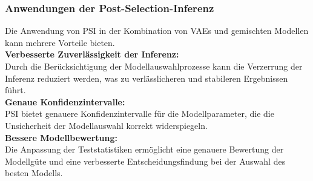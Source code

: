\documentclass[%
thesis=student,%
coverpage=false,%
titlepage=false,%
headmarks=true, %
german,%
font=libertine, %
math=newpxtx, %
BCOR=5mm,%
coverBCOR=11mm%
]{tumbook}
\theoremstyle{break}
\begin{document}
\subsubsection{Anwendungen der Post-Selection-Inferenz}
Die Anwendung von PSI in der Kombination von VAEs und gemischten Modellen kann mehrere Vorteile bieten.
\\
\textbf{Verbesserte Zuverlässigkeit der Inferenz:}\\
Durch die Berücksichtigung der Modellauswahlprozesse kann die Verzerrung der Inferenz reduziert werden, was zu verlässlicheren und stabileren Ergebnissen führt.\\
\textbf{Genaue Konfidenzintervalle:}\\
PSI bietet genauere Konfidenzintervalle für die Modellparameter, die die Unsicherheit der Modellauswahl korrekt widerspiegeln.\\
\textbf{Bessere Modellbewertung:}\\ 
Die Anpassung der Teststatistiken ermöglicht eine genauere Bewertung der Modellgüte und eine verbesserte Entscheidungsfindung bei der Auswahl des besten Modells.
\end{document}
